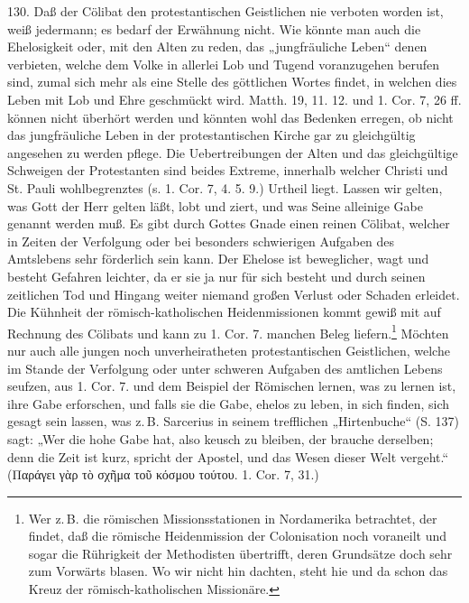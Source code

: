 130. Daß der Cölibat den protestantischen Geistlichen nie verboten worden ist, weiß jedermann; es bedarf der Erwähnung nicht. Wie könnte man auch die Ehelosigkeit oder, mit den Alten zu reden, das „jungfräuliche Leben“ denen verbieten, welche dem Volke in allerlei Lob und Tugend voranzugehen berufen sind, zumal sich mehr als eine Stelle des göttlichen Wortes findet, in welchen dies Leben mit Lob und Ehre geschmückt wird. Matth. 19, 11. 12. und 1. Cor. 7, 26 ff. können nicht überhört werden und könnten wohl das Bedenken erregen, ob nicht das jungfräuliche Leben in der protestantischen Kirche gar zu gleichgültig angesehen zu werden pflege. Die Uebertreibungen der Alten und das gleichgültige Schweigen der Protestanten sind beides Extreme, innerhalb welcher Christi und St. Pauli wohlbegrenztes (s. 1. Cor. 7, 4. 5. 9.) Urtheil liegt. Lassen wir gelten, was Gott der Herr gelten läßt, lobt und ziert, und was Seine alleinige Gabe genannt werden muß. Es gibt durch Gottes Gnade einen
reinen Cölibat, welcher in Zeiten der Verfolgung oder bei besonders schwierigen Aufgaben des Amtslebens sehr förderlich sein kann. Der Ehelose ist beweglicher, wagt und besteht Gefahren leichter, da er sie ja nur für sich besteht und durch seinen zeitlichen Tod und Hingang weiter niemand großen Verlust oder Schaden erleidet. Die Kühnheit der römisch-katholischen Heidenmissionen kommt gewiß mit auf Rechnung des Cölibats und kann zu 1. Cor. 7. manchen Beleg liefern.\footnote{Wer z.\,B. die römischen Missionsstationen in Nordamerika betrachtet, der findet, daß die römische Heidenmission der Colonisation noch voraneilt und sogar die Rührigkeit der Methodisten übertrifft, deren Grundsätze doch sehr zum Vorwärts blasen. Wo wir nicht hin dachten, steht hie und da schon das Kreuz der römisch-katholischen Missionäre.} Möchten nur auch alle jungen noch unverheiratheten protestantischen Geistlichen, welche im Stande der Verfolgung oder unter schweren Aufgaben des amtlichen Lebens seufzen, aus 1. Cor. 7. und dem Beispiel der Römischen lernen, was zu lernen ist, ihre Gabe erforschen, und falls sie die Gabe, ehelos zu leben, in sich finden, sich gesagt sein lassen, was z.\,B. Sarcerius in seinem trefflichen „Hirtenbuche“ (S. 137) sagt: „Wer die hohe Gabe hat, also keusch zu bleiben, der brauche derselben; denn die Zeit ist kurz, spricht der Apostel, und das Wesen dieser Welt vergeht.“ (Παράγει γὰρ τὸ σχῆμα τοῦ κόσμου τούτου. 1. Cor. 7, 31.)

